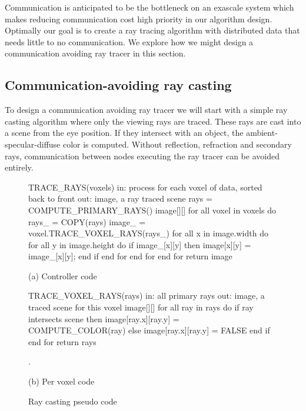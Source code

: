 Communication is anticipated to be the bottleneck on an exascale system which
makes reducing communication cost high priority in our algorithm design.  
Optimally our goal is to create a ray tracing algorithm with distributed data 
that needs little to no communication.  We explore how we might design a 
communication avoiding ray tracer in this section.

\subsection{Communication-avoiding ray casting}
\label{sec:ca-ray-casting}
To design a communication avoiding ray tracer we will start with a simple ray
casting algorithm where only the viewing rays are traced. These rays are 
cast into a scene from the eye position.  If they intersect with an object, the 
ambient-specular-diffuse color is computed.  Without reflection, refraction and 
secondary rays, communication between nodes executing the ray tracer can be 
avoided entirely.

\begin{figure}[!htb]
\begin{algorithm}
TRACE_RAYS(voxels) 
  in: process for each voxel of 
      data, sorted back to front
  out: image, a ray traced scene
  rays = COMPUTE_PRIMARY_RAYS()
  image[][]
  for all voxel in voxels do
    rays_ = COPY(rays)
    image_ = voxel.TRACE_VOXEL_RAYS(rays_)
    for all x in image.width do
      for all y in image.height do
        if image_[x][y] then
          image[x][y] = image_[x][y];
        end if
      end for
    end for
  end for
return image
\end{algorithm}

(a) Controller code

\endminipage\hfill
{}
\begin{algorithm}
TRACE_VOXEL_RAYS(rays)
  in:  all primary rays
  out: image, a traced scene 
       for this voxel
  image[][]
  for all ray in rays do
    if ray intersects scene then
      image[ray.x][ray.y] = COMPUTE_COLOR(ray)
    else
      image[ray.x][ray.y] = FALSE
    end if
  end for
return rays




.
\end{algorithm}

(b) Per voxel code

\endminipage\hfill
\caption{Ray casting pseudo code}
\label{fig:ray_caster}
\end{figure}

